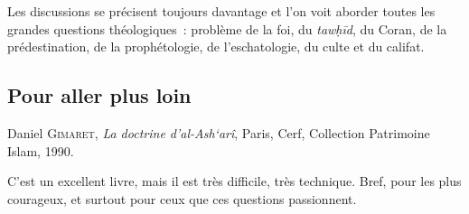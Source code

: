 Les discussions se précisent toujours davantage et l'on voit aborder
toutes les grandes questions théologiques~: problème de la foi, du
\emph{tawḥīd}, du Coran, de la prédestination, de la prophétologie, de
l'eschatologie, du culte et du califat.






\subsection{Pour aller plus loin}

Daniel \textsc{Gimaret}, \emph{La doctrine d'al-Ash`arî}, Paris, Cerf,
Collection Patrimoine Islam, 1990.

C'est un excellent livre, mais il est très difficile, très technique.
Bref, pour les plus courageux, et surtout pour ceux que ces questions
passionnent.
 
 